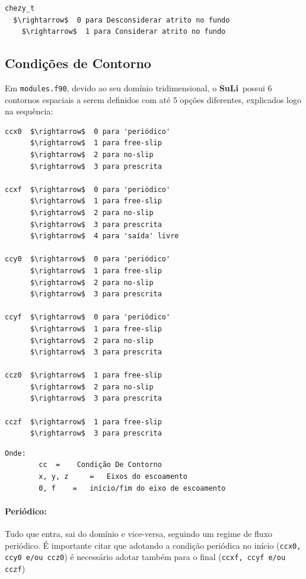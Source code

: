 \documentclass[12pt, a4paper]{article}
\newcommand{\SL}{{\bf SuLi}}
\begin{document}
\begin{lstlisting}[escapeinside='']
chezy_t	
  $\rightarrow$  0 para Desconsiderar atrito no fundo
	$\rightarrow$  1 para Considerar atrito no fundo
\end{lstlisting}


\subsection{Condições de Contorno}
Em \verb|modules.f90|, devido ao seu domínio tridimensional, o \SL\ possui 6 contornos espaciais a serem definidos com até 5 opções diferentes, explicados logo na sequência:
\begin{lstlisting}[escapeinside='']
ccx0  $\rightarrow$  0 para 'periódico'
      $\rightarrow$  1 para free-slip
      $\rightarrow$  2 para no-slip
      $\rightarrow$  3 para prescrita

ccxf  $\rightarrow$  0 para 'periódico'
      $\rightarrow$  1 para free-slip
      $\rightarrow$  2 para no-slip
      $\rightarrow$  3 para prescrita
      $\rightarrow$  4 para 'saída' livre
      
ccy0  $\rightarrow$  0 para 'periódico'
      $\rightarrow$  1 para free-slip
      $\rightarrow$  2 para no-slip
      $\rightarrow$  3 para prescrita
      
ccyf  $\rightarrow$  0 para 'periódico'
      $\rightarrow$  1 para free-slip
      $\rightarrow$  2 para no-slip
      $\rightarrow$  3 para prescrita
      
ccz0  $\rightarrow$  1 para free-slip
      $\rightarrow$  2 para no-slip
      $\rightarrow$  3 para prescrita
      
cczf  $\rightarrow$  1 para free-slip
      $\rightarrow$  3 para prescrita
\end{lstlisting}

\begin{verbatim}
Onde: 	
		cc 	=	 Condição De Contorno
		x, y, z 	=	Eixos do escoamento
		0, f	= 	início/fim do eixo de escoamento
\end{verbatim}

\paragraph{Periódico:} Tudo que entra, sai do domínio e vice-versa, seguindo um regime de fluxo periódico. É importante citar que adotando a condição periódica no início (\verb|ccx0, ccy0 e/ou ccz0|) é necessário adotar também para o final (\verb|ccxf, ccyf e/ou cczf|)
\end{document}
